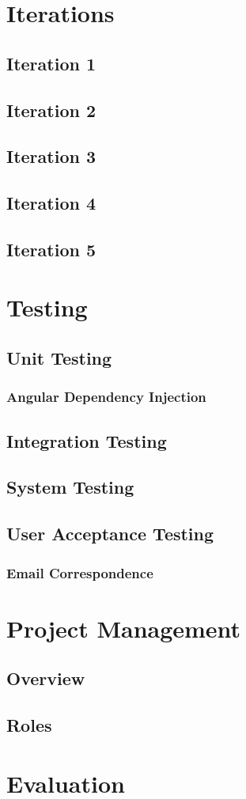 \documentclass[12pt]{article}
\begin{document}
\section{Iterations}
  \subsection{Iteration 1}
  \subsection{Iteration 2}
  \subsection{Iteration 3}
  \subsection{Iteration 4}
  \subsection{Iteration 5}
\section{Testing}
  \subsection{Unit Testing}
    \subsubsection{Angular Dependency Injection}
  \subsection{Integration Testing}
  \subsection{System Testing}
  \subsection{User Acceptance Testing}
    \subsubsection{Email Correspondence}
\section{Project Management}
  \subsection{Overview}
  \subsection{Roles}
\section{Evaluation}
\end{document}

